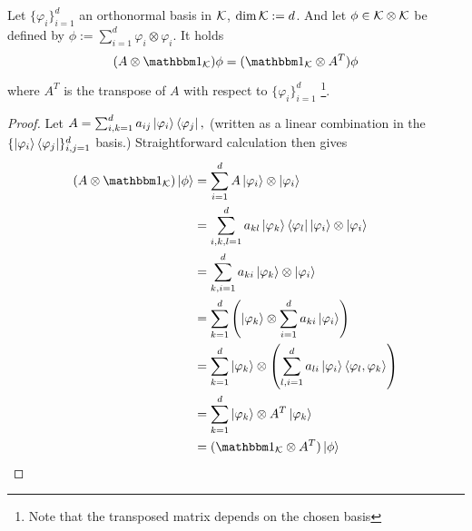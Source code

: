 \begin{lemma} \label{lemma:entanglement_trick}
 Let $\{\varphi_i\}_{i=1}^d$ an orthonormal basis in ${\mathcal K}$, $\dim {\mathcal K} := d$. And let $\phi \in {\mathcal K} \otimes {\mathcal K}$ be defined by $
  \phi := \sum_{i =1}^d \varphi_i \otimes \varphi_i.
  $
 It holds
 \begin{align*}
  (A \otimes \bbmeins_{\cK}) \phi = (\bbmeins_\cK \otimes A^T) \phi 
 \end{align*}
 where $A^T$ is the transpose of $A$ with respect to $\{\varphi_i\}_{i=1}^d$ \footnote{Note that the transposed matrix depends on the chosen basis}.
\end{lemma}
 \begin{proof}
  Let 
$ 
   A = \sum_{i,k=1}^d a_{ij} \ket{\varphi_i}\bra{\varphi_j},
 $
  (written as a linear combination in the $\{\ket{\varphi_i}\bra{\varphi_j}\}_{i,j=1}^d$ basis.) Straightforward calculation then gives 
  \begin{align*}
   (A \otimes \bbmeins_\cK)\ket{\phi}
   & = \sum_{i=1}^d A \ket{\varphi_i} \otimes \ket{\varphi_i} \\
   & = \sum_{i,k,l =1}^d a_{kl} \ket{\varphi_k}\bra{\varphi_l}\ket{\varphi_i} \otimes \ket{\varphi_i} \\
   & = \sum_{k,i =1}^d a_{ki} \ket{\varphi_k} \otimes \ket{\varphi_i} \\
   & = \sum_{k =1}^d\left( \ket{\varphi_k} \otimes \sum_{i =1}^d a_{ki}\ket{\varphi_i} \right) \\
   & = \sum_{k =1}^d \ket{\varphi_k} \otimes \left(\sum_{l,i =1}^d a_{li}\ket{\varphi_i} \braket{\varphi_l,\varphi_k}\right) \\
   & = \sum_{k =1}^d \ket{\varphi_k} \otimes A^T \ket{\varphi_k} \\
   & = (\bbmeins_\cK \otimes A^T) \ket{\phi}
  \end{align*}
 \end{proof}
